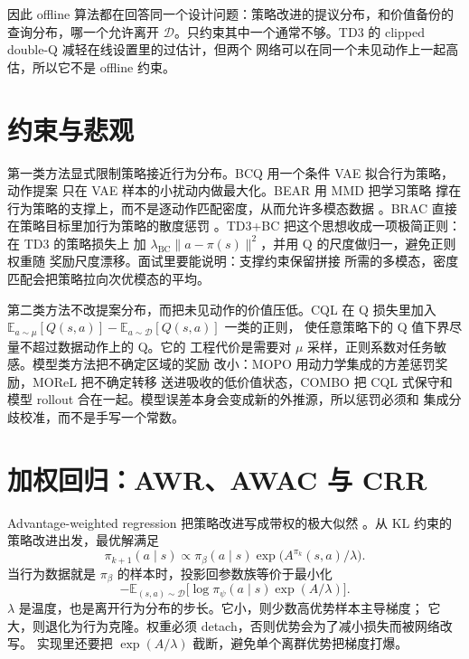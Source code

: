 \documentclass[10pt,twocolumn,a4paper]{ctexart}
\begin{document}
因此 offline 算法都在回答同一个设计问题：策略改进的提议分布，和价值备份的
查询分布，哪一个允许离开 $\mathcal{D}$。只约束其中一个通常不够。TD3 的 clipped
double-Q 减轻在线设置里的过估计\citep{fujimoto2018td3,vanhasselt2016ddqn}，但两个
网络可以在同一个未见动作上一起高估，所以它不是 offline 约束。

\section{约束与悲观}
第一类方法显式限制策略接近行为分布。BCQ 用一个条件 VAE 拟合行为策略，动作提案
只在 VAE 样本的小扰动内做最大化\citep{fujimoto2019bcq}。BEAR 用 MMD 把学习策略
撑在行为策略的支撑上，而不是逐动作匹配密度，从而允许多模态数据
\citep{kumar2019bear}。BRAC 直接在策略目标里加行为策略的散度惩罚
\citep{wu2019behavior}。TD3+BC 把这个思想收成一项极简正则：在 TD3 的策略损失上
加 $\lambda_{\mathrm{BC}}\|a-\pi(s)\|^{2}$，并用 Q 的尺度做归一，避免正则权重随
奖励尺度漂移\citep{fujimoto2021minimalist}。面试里要能说明：支撑约束保留拼接
所需的多模态，密度匹配会把策略拉向次优模态的平均。

第二类方法不改提案分布，而把未见动作的价值压低。CQL 在 Q 损失里加入
$\mathbb{E}_{a\sim\mu}[Q(s,a)]-\mathbb{E}_{a\sim\mathcal{D}}[Q(s,a)]$ 一类的正则，
使任意策略下的 Q 值下界尽量不超过数据动作上的 Q\citep{kumar2020cql}。它的
工程代价是需要对 $\mu$ 采样，正则系数对任务敏感。模型类方法把不确定区域的奖励
改小：MOPO 用动力学集成的方差惩罚奖励\citep{yu2020mopo}，MOReL 把不确定转移
送进吸收的低价值状态\citep{kidambi2020morel}，COMBO 把 CQL 式保守和模型 rollout
合在一起\citep{yu2021combo}。模型误差本身会变成新的外推源，所以惩罚必须和
集成分歧校准，而不是手写一个常数\citep{ghasemipour2022why}。

\section{加权回归：AWR、AWAC 与 CRR}
Advantage-weighted regression 把策略改进写成带权的极大似然
\citep{peng2019awr}。从 KL 约束的策略改进出发，最优解满足
\begin{equation}
\pi_{k+1}(a\mid s)\propto \pi_{\beta}(a\mid s)\exp\bigl(A^{\pi_k}(s,a)/\lambda\bigr).
\end{equation}
当行为数据就是 $\pi_{\beta}$ 的样本时，投影回参数族等价于最小化
\begin{equation}
-\mathbb{E}_{(s,a)\sim\mathcal{D}}\bigl[\log\pi_\psi(a\mid s)\exp(A/\lambda)\bigr].
\end{equation}
$\lambda$ 是温度，也是离开行为分布的步长。它小，则少数高优势样本主导梯度；
它大，则退化为行为克隆。权重必须 detach，否则优势会为了减小损失而被网络改写。
实现里还要把 $\exp(A/\lambda)$ 截断，避免单个离群优势把梯度打爆。
\end{document}
